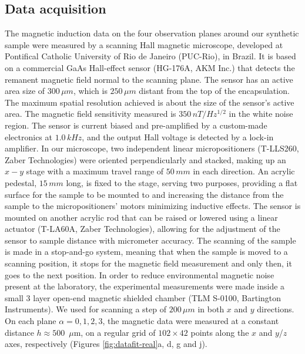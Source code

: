 \documentclass[galley,gc]{agutex}
\begin{document}
\begin{article}
\subsection{Data acquisition}
\label{subsec:Data acquisition and pre-processing}

The magnetic induction data on the four observation planes around our 
synthetic sample were measured by a scanning Hall magnetic microscope, 
developed at Pontifical Catholic University of Rio de Janeiro (PUC-Rio), 
in Brazil. It is based on a commercial GaAs Hall-effect sensor 
(HG-176A, AKM Inc.) that detects the remanent magnetic field normal 
to the scanning plane. The sensor has an active area size of $300 \, \mu m$, 
which is $250 \, \mu m$ distant from the top of the encapsulation. The 
maximum spatial resolution achieved is about the size of the sensor’s 
active area. The magnetic field sensitivity measured is $350 \, nT/Hz^{1/2}$ 
in the white noise region. The sensor is current biased and pre-amplified 
by a custom-made electronics at $1.0 \, kHz$, and the output Hall voltage 
is detected by a lock-in amplifier. In our microscope, two independent 
linear micropositioners (T-LLS260, Zaber Technologies) were oriented 
perpendicularly and stacked, making up an $x-y$ stage with a maximum travel 
range of $50 \, mm$ in each direction. An acrylic pedestal, $15 \, mm$ long, 
is fixed to the stage, serving two purposes, providing a flat surface for 
the sample to be mounted to and increasing the distance from the sample to 
the micropositioners’ motors minimizing inductive effects. The sensor is 
mounted on another acrylic rod that can be raised or lowered using a linear 
actuator (T-LA60A, Zaber Technologies), allowing for the adjustment of the 
sensor to sample distance with micrometer accuracy. The scanning of the 
sample is made in a stop-and-go system, meaning that when the sample is 
moved to a scanning position, it stops for the magnetic field measurement 
and only then, it goes to the next position. In order to reduce 
environmental magnetic noise present at the laboratory, the experimental 
measurements were made inside a small 3 layer open-end magnetic shielded 
chamber (TLM S-0100, Bartington Instruments). We used for scanning a step 
of $200 \, \mu m$ in both $x$ and $y$ directions. On each plane 
$\alpha = 0, 1, 2, 3$, the magnetic data were measured at a constant 
distance $h \approx 500$~$\mu$m, on a regular grid of $102 \times 42$ 
points along the $x$ and $y$/$z$ axes, respectively 
(Figures \ref{fig:datafit-real}a, d, g and j).


\end{article}
\end{document}
